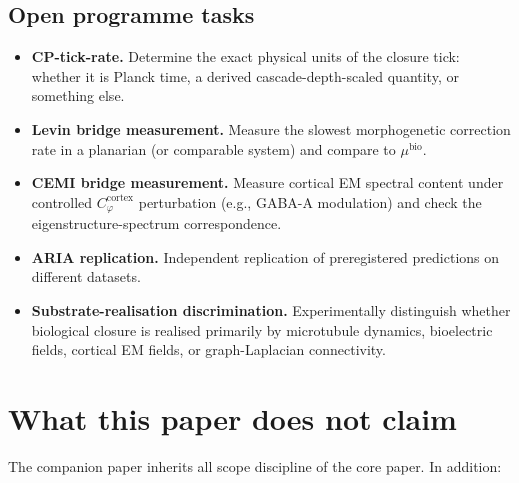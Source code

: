 \documentclass[11pt]{article}
\theoremstyle{plain}
\theoremstyle{definition}
\theoremstyle{remark}
\newcommand{\Cph}{C_\varphi}
\begin{document}
\subsection{Open programme tasks}

\begin{itemize}[leftmargin=2em]
\item \textbf{CP-tick-rate.} Determine the exact physical units of the closure tick: whether it is Planck time, a derived cascade-depth-scaled quantity, or something else.
\item \textbf{Levin bridge measurement.} Measure the slowest morphogenetic correction rate in a planarian (or comparable system) and compare to $\mu^{\mathrm{bio}}$.
\item \textbf{CEMI bridge measurement.} Measure cortical EM spectral content under controlled $\Cph^{\mathrm{cortex}}$ perturbation (e.g., GABA-A modulation) and check the eigenstructure-spectrum correspondence.
\item \textbf{ARIA replication.} Independent replication of preregistered predictions on different datasets.
\item \textbf{Substrate-realisation discrimination.} Experimentally distinguish whether biological closure is realised primarily by microtubule dynamics, bioelectric fields, cortical EM fields, or graph-Laplacian connectivity.
\end{itemize}

\section{What this paper does not claim}\label{sec:scope}

The companion paper inherits all scope discipline of the core paper. In addition:
\end{document}
